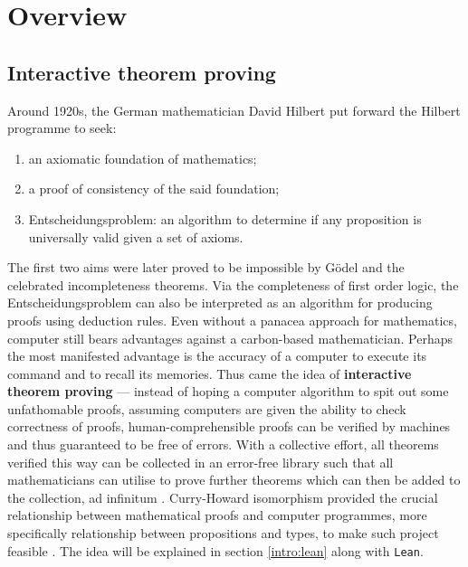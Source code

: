 \documentclass{report}
\theoremstyle{definition}
\theoremstyle{plain}
\begin{document}

\tableofcontents

\chapter{Overview}
\section{Interactive theorem proving}
Around 1920s, the German mathematician David Hilbert put forward the Hilbert programme to seek:
\begin{enumerate}
  \item an axiomatic foundation of mathematics;
  \item a proof of consistency of the said foundation;
  \item Entscheidungsproblem: an algorithm to determine if any proposition is universally valid given a set of axioms.
\end{enumerate}
The first two aims were later proved to be impossible by Gödel and the celebrated incompleteness theorems. Via the completeness of first order logic, the Entscheidungsproblem can also be interpreted as an algorithm for producing proofs using deduction rules. Even without a panacea approach for mathematics, computer still bears advantages against a carbon-based mathematician. Perhaps the most manifested advantage is the accuracy of a computer to execute its command and to recall its memories. Thus came the idea of {\bf interactive theorem proving} --- instead of hoping a computer algorithm to spit out some unfathomable proofs, assuming computers are given the ability to check correctness of proofs, human-comprehensible proofs can be verified by machines and thus guaranteed to be free of errors. With a collective effort, all theorems verified this way can be collected in an error-free library such that all mathematicians can utilise to prove further theorems which can then be added to the collection, ad infinitum \cite{boyer1994qed}. Curry-Howard isomorphism provided the crucial relationship between mathematical proofs and computer programmes, more specifically relationship between propositions and types, to make such project feasible \cite{kennedy2011set}. The idea will be explained in section \ref{intro:lean} along with {\tt Lean}. 
\end{document}
